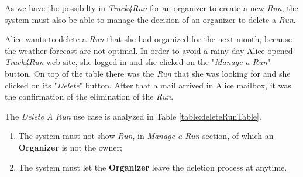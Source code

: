 As we have the possibilty in \textit{Track4Run} for an organizer to create a new \textit{Run}, the system must also be able to manage the decision of an organizer to delete a \textit{Run}.

Alice wants to delete a \textit{Run} that she had organized for the next month, because the weather forecast are not optimal.
In order to avoid a rainy day Alice opened \textit{Track4Run} web-site, she logged in and she clicked on the "\textit{Manage a Run}" button.
On top of the table there was the \textit{Run} that she was looking for and she clicked on its "\textit{Delete}" button.
After that a mail arrived in Alice mailbox, it was the confirmation of the elimination of the \textit{Run}.

The \textit{Delete A Run} use case is analyzed in Table \ref{table:deleteRunTable}.

\begin{enumerate}
  \item The system must not show \textit{Run}, in \textit{Manage a Run} section, of which an \textbf{Organizer} is not the owner;
  \item The system must let the \textbf{Organizer} leave the deletion process at anytime.
\end{enumerate}

